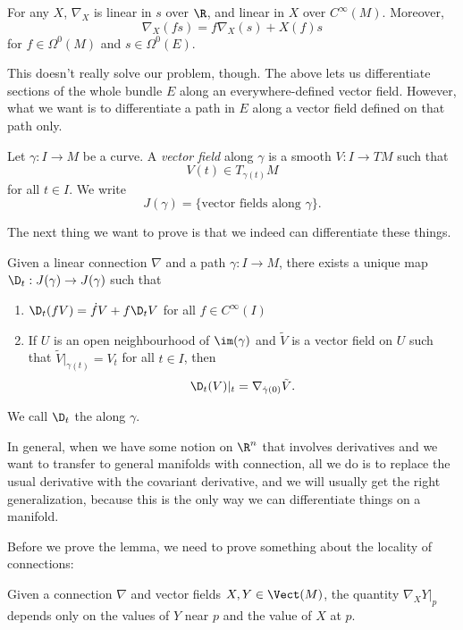 \documentclass[a4paper]{article}
\begin{document}
\begin{prop}
  For any $X$, $\nabla_X$ is linear in $s$ over $\R$, and linear in $X$ over $C^\infty(M)$. Moreover,
  \[
    \nabla_X(fs) = f \nabla_X(s) + X(f) s
  \]
  for $f \in \Omega^0(M)$ and $s \in \Omega^0(E)$.
\end{prop}

This doesn't really solve our problem, though. The above lets us differentiate sections of the whole bundle $E$ along an everywhere-defined vector field. However, what we want is to differentiate a path in $E$ along a vector field defined on that path only.

\begin{defi}
  Let $\gamma: I \to M$ be a curve. A \emph{vector field} along $\gamma$ is a smooth $V: I \to TM$ such that
  \[
    V(t) \in T_{\gamma(t)} M
  \]
  for all $t \in I$. We write
  \[
    J(\gamma) = \{\text{vector fields along $\gamma$}\}.
  \]
\end{defi}
The next thing we want to prove is that we indeed can differentiate these things.

\begin{lemma}
  Given a linear connection $\nabla$ and a path $\gamma: I \to M$, there exists a unique map $\D_t: J(\gamma) \to J(\gamma)$ such that
  \begin{enumerate}
    \item $\D_t(fV) = \dot{f} V + f \D_t V$ for all $f \in C^\infty(I)$
    \item If $U$ is an open neighbourhood of $\im(\gamma)$ and $\tilde{V}$ is a vector field on $U$ such that $\tilde{V}|_{\gamma(t)} = V_t$ for all $t \in I$, then
      \[
        \D_t(V)|_t = \nabla_{\dot{\gamma}(0)} \tilde{V}.
      \]
  \end{enumerate}
  We call $\D_t$ the  along $\gamma$.
\end{lemma}
In general, when we have some notion on $\R^n$ that involves derivatives and we want to transfer to general manifolds with connection, all we do is to replace the usual derivative with the covariant derivative, and we will usually get the right generalization, because this is the only way we can differentiate things on a manifold.

Before we prove the lemma, we need to prove something about the locality of connections:
\begin{lemma}
  Given a connection $\nabla$ and vector fields $X, Y \in \Vect(M)$, the quantity $\nabla_X Y|_p$ depends only on the values of $Y$ near $p$ and the value of $X$ at $p$.
\end{lemma}
\end{document}
